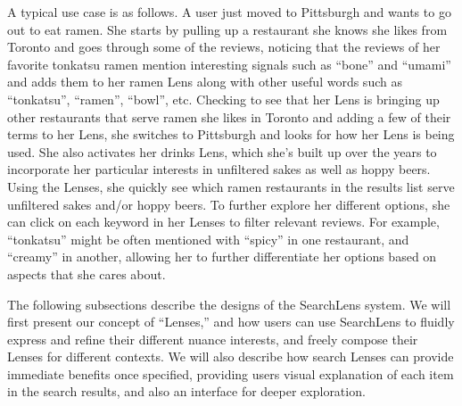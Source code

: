 \documentclass{sigchi}
\begin{document}
A typical use case is as follows. A user just moved to Pittsburgh and wants to go out to eat ramen. She starts by pulling up a restaurant she knows she likes from Toronto and goes through some of the reviews, noticing that the reviews of her favorite tonkatsu ramen mention interesting signals such as ``bone'' and ``umami'' and adds them to her ramen Lens along with other useful words such as ``tonkatsu'', ``ramen'', ``bowl'', etc. Checking to see that her Lens is bringing up other restaurants that serve ramen she likes in Toronto and adding a few of their terms to her Lens, she switches to Pittsburgh and looks for how her Lens is being used.  She also activates her drinks Lens, which she's built up over the years to incorporate her particular interests in unfiltered sakes as well as hoppy beers. Using the Lenses, she quickly see which ramen restaurants in the results list serve unfiltered sakes and/or hoppy beers. To further explore her different options, she can click on each keyword in her Lenses to filter relevant reviews. For example, ``tonkatsu'' might be often mentioned with ``spicy'' in one restaurant, and ``creamy'' in another, allowing her to further differentiate her options based on aspects that she cares about.

The following subsections describe the designs of the SearchLens system. We will first present our concept of ``Lenses,'' and how users can use SearchLens to fluidly express and refine their different nuance interests, and freely compose their Lenses for different contexts. We will also describe how search Lenses can provide immediate benefits once specified, providing users visual explanation of each item in the search results, and also an interface for deeper exploration.


    
    
\end{document}
